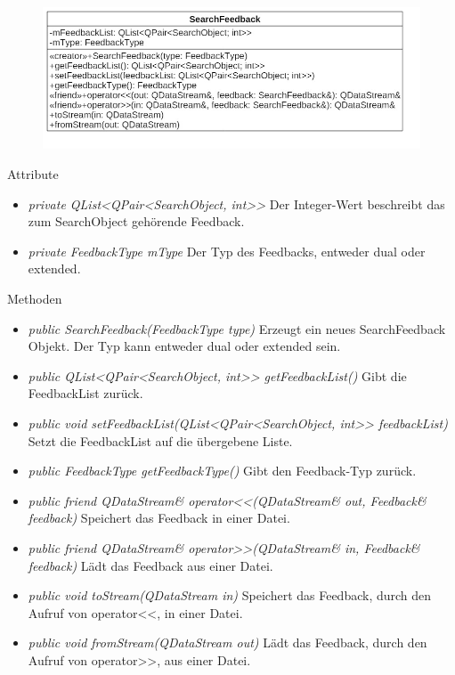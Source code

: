 \begin{figure}[H]
\centering
\includegraphics[scale=0.5]{img/Klassendiagramm/Klassen/SearchFeedback}
\label{fig:searchFeedback}
\end{figure}

Attribute
\begin{itemize}
\item\textit{private QList<QPair<SearchObject, int>>} Der Integer-Wert beschreibt das zum SearchObject gehörende Feedback.
\item\textit{private FeedbackType mType} Der Typ des Feedbacks, entweder dual oder extended.
\end{itemize}

Methoden
\begin{itemize}
\item \textit{public SearchFeedback(FeedbackType type)} Erzeugt ein neues SearchFeedback Objekt. Der Typ kann entweder dual oder extended sein.
\item \textit{public QList<QPair<SearchObject, int>>  getFeedbackList()} Gibt die FeedbackList  zurück.
\item \textit{public void setFeedbackList(QList<QPair<SearchObject, int>> feedbackList)} Setzt die FeedbackList auf die übergebene Liste.
\item \textit{public FeedbackType getFeedbackType()} Gibt den Feedback-Typ zurück.
\item \textit{public friend QDataStream\& operator<<(QDataStream\& out, Feedback\& feedback)} Speichert das Feedback in einer Datei.
\item \textit{public friend QDataStream\& operator>>(QDataStream\& in, Feedback\& feedback)} Lädt das Feedback aus einer Datei.
\item \textit{public void toStream(QDataStream in)} Speichert das Feedback, durch den Aufruf von operator<<, in einer Datei.
\item \textit{public void fromStream(QDataStream out)} Lädt das Feedback, durch den Aufruf von operator>>, aus einer Datei.
\end{itemize} 

